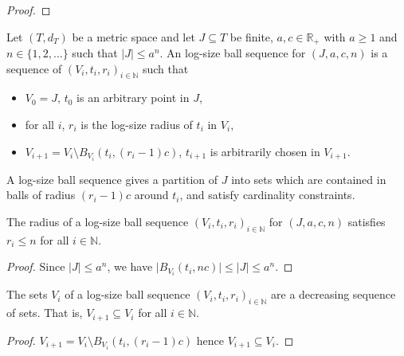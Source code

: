 \begin{proof}\leanok

\end{proof}


\begin{definition}\label{def:logSizeBallSequence}
  \leanok
Let $(T,d_T)$ be a metric space and let $J \subseteq T$ be finite, $a,c \in \mathbb R_+$ with $a \ge 1$ and $n \in \{1, 2, ...\}$ such that $|J| \le a^n$.
An log-size ball sequence for $(J, a, c, n)$ is a sequence of $(V_i, t_i, r_i)_{i \in \mathbb{N}}$ such that
\begin{itemize}
  \item $V_0 = J$, $t_0$ is an arbitrary point in $J$,
  \item for all $i$, $r_i$ is the log-size radius of $t_i$ in $V_i$,
  \item $V_{i+1} = V_i \setminus B_{V_i}(t_i, (r_i - 1)c)$, $t_{i+1}$ is arbitrarily chosen in $V_{i+1}$.
\end{itemize}
\end{definition}

A log-size ball sequence gives a partition of $J$ into sets which are contained in balls of radius $(r_i - 1)c$ around $t_i$, and satisfy cardinality constraints.


\begin{lemma}\label{lem:logSizeRadius_logSizeBallSequence_le}
  \leanok
The radius of a log-size ball sequence $(V_i, t_i, r_i)_{i \in \mathbb{N}}$ for $(J, a, c, n)$ satisfies $r_i \le n$ for all $i \in \mathbb{N}$.
\end{lemma}

\begin{proof}
\leanok
Since $|J| \le a^n$, we have $\vert B_{V_i}(t_i, n c) \vert \le \vert J \vert \le a^{n}$.
\end{proof}


\begin{lemma}\label{lem:logSizeBallSequence_V_anti}
  \leanok
The sets $V_i$ of a log-size ball sequence $(V_i, t_i, r_i)_{i \in \mathbb{N}}$ are a decreasing sequence of sets. That is, $V_{i+1} \subseteq V_i$ for all $i \in \mathbb{N}$.
\end{lemma}

\begin{proof}
\leanok
$V_{i+1} = V_i \setminus B_{V_i}(t_i, (r_i - 1)c)$ hence $V_{i+1} \subseteq V_i$.
\end{proof}


